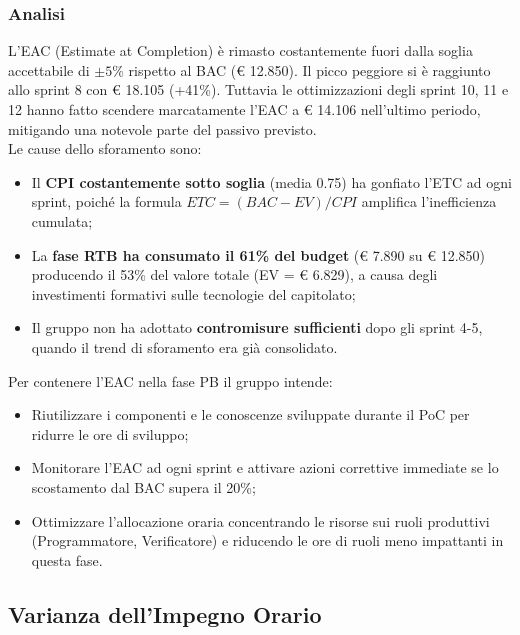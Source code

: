 \documentclass[a4paper,11pt,oneside]{scrartcl}
\begin{document}
\subsubsection*{Analisi}

L'EAC (Estimate at Completion) è rimasto costantemente fuori dalla soglia accettabile di $\pm 5\%$ rispetto al BAC (\euro{} 12.850). Il picco peggiore si è raggiunto allo sprint 8 con \euro{} 18.105 (+41\%). Tuttavia le ottimizzazioni degli sprint 10, 11 e 12 hanno fatto scendere marcatamente l'EAC a \euro{} 14.106 nell'ultimo periodo, mitigando una notevole parte del passivo previsto.\\
Le cause dello sforamento sono:
\begin{itemize}
    \item Il \textbf{CPI costantemente sotto soglia} (media 0.75) ha gonfiato l'ETC ad ogni sprint, poiché la formula $ETC = (BAC - EV) / CPI$ amplifica l'inefficienza cumulata;
    \item La \textbf{fase RTB ha consumato il 61\% del budget} (\euro{} 7.890 su \euro{} 12.850) producendo il 53\% del valore totale (EV = \euro{} 6.829), a causa degli investimenti formativi sulle tecnologie del capitolato;
    \item Il gruppo non ha adottato \textbf{contromisure sufficienti} dopo gli sprint 4-5, quando il trend di sforamento era già consolidato.
\end{itemize}

Per contenere l'EAC nella fase PB il gruppo intende:
\begin{itemize}
    \item Riutilizzare i componenti e le conoscenze sviluppate durante il PoC per ridurre le ore di sviluppo;
    \item Monitorare l'EAC ad ogni sprint e attivare azioni correttive immediate se lo scostamento dal BAC supera il 20\%;
    \item Ottimizzare l'allocazione oraria concentrando le risorse sui ruoli produttivi (Programmatore, Verificatore) e riducendo le ore di ruoli meno impattanti in questa fase.
\end{itemize}

\subsection{Varianza dell'Impegno Orario}
\end{document}
